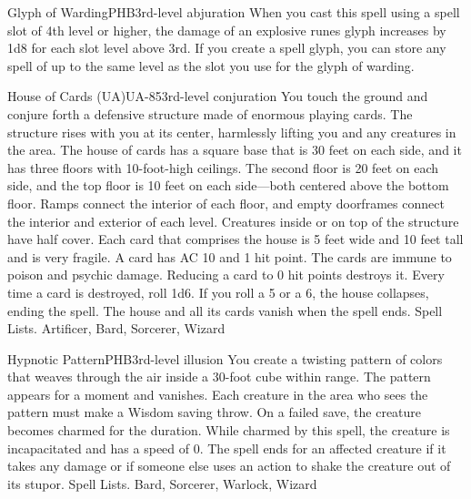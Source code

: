 \begin{spell}{Glyph of Warding}{PHB}{3rd-level abjuration}
 When you cast this spell using a spell slot of 4th level or higher, the damage of an explosive runes glyph increases by 1d8 for each slot level above 3rd. If you create a spell glyph, you can store any spell of up to the same level as the slot you use for the glyph of warding.
\end{spell}

\begin{spell}{House of Cards (UA)}{UA-85}{3rd-level conjuration}
{
}
You touch the ground and conjure forth a defensive structure made of enormous playing cards. The structure rises with you at its center, harmlessly lifting you and any creatures in the area. The house of cards has a square base that is 30 feet on each side, and it has three floors with 10-foot-high ceilings. The second floor is 20 feet on each side, and the top floor is 10 feet on each side—both centered above the bottom floor. Ramps connect the interior of each floor, and empty doorframes connect the interior and exterior of each level. Creatures inside or on top of the structure have half cover.
Each card that comprises the house is 5 feet wide and 10 feet tall and is very fragile. A card has AC 10 and 1 hit point. The cards are immune to poison and psychic damage. Reducing a card to 0 hit points destroys it. Every time a card is destroyed, roll 1d6. If you roll a 5 or a 6, the house collapses, ending the spell.
The house and all its cards vanish when the spell ends.
Spell Lists. Artificer, Bard, Sorcerer, Wizard
\end{spell}

\begin{spell}{Hypnotic Pattern}{PHB}{3rd-level illusion}
{
}
You create a twisting pattern of colors that weaves through the air inside a 30-foot cube within range. The pattern appears for a moment and vanishes. Each creature in the area who sees the pattern must make a Wisdom saving throw. On a failed save, the creature becomes charmed for the duration. While charmed by this spell, the creature is incapacitated and has a speed of 0.
The spell ends for an affected creature if it takes any damage or if someone else uses an action to shake the creature out of its stupor.
Spell Lists. Bard, Sorcerer, Warlock, Wizard
\end{spell}

